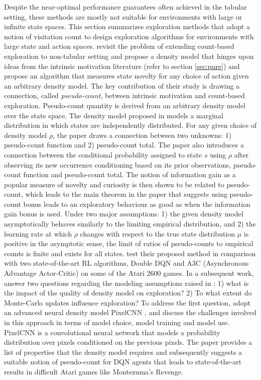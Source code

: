 Despite the near-optimal performance guarantees often achieved in the tabular setting, these methods are mostly not suitable for environments with large or infinite state spaces. This section summarizes exploration methods that adopt a notion of visitation count to design exploration algorithms for environments with large state and action spaces. 
 revisit the problem of extending count-based exploration to non-tabular setting and propose a density model that hinges upon ideas from the intrinsic motivation literature (refer to section \ref{sec:pure}) and propose an algorithm that measures state novelty for any choice of action given an arbitrary density model. The key contribution of their study is drawing a connection, called \textit{pseudo-count}, between intrinsic motivation and count-based exploration. Pseudo-count quantity is derived from an arbitrary density model over the state space. The density model proposed in  models a marginal distribution in which states are independently distributed. For any given choice of density model $ \rho $, the paper draws a connection between two unknowns: 1) pseudo-count function and 2) pseudo-count total.  The paper also introduces a connection between the conditional probability assigned to state $s$ using $ \rho $ after observing its new occurrence conditioning based on its prior observations, pseudo-count function and pseudo-count total.  The notion of information gain as a popular measure of novelty and curiosity is then shown to be related to pseudo-count, which leads to the main theorem in the paper that suggests using pseudo-count bonus leads to an exploratory behaviour as good as when the information gain bonus is used. Under two major assumptions: 1) the given density model asymptotically behaves similarly to the limiting empirical distribution, and 2) the learning rate at which $\rho$ changes with respect to the true state distribution $\mu$ is positive in the asymptotic sense, the limit of ratios of pseudo-counts to empirical counts is finite and exists for all states.  test their proposed method in comparison with two state-of-the-art RL algorithms, Double DQN  and A3C (Asynchronous Advantage Actor-Critic)  on some of the Atari 2600 games. 
In a subsequent work,  answer two questions regarding the modeling assumptions raised in : 1) what is the impact of the quality of density model on exploration? 2) To what extent do Monte-Carlo updates influence exploration? To address the first question,  adopt an advanced neural density model PixelCNN , and discuss the challenges involved in this approach in terms of model choice, model training and model use. PixelCNN is a convolutional neural network that models a probability distribution over pixels conditioned on the previous pixels. The paper provides a list of properties that the density model requires and subsequently suggests a suitable notion of pseudo-count for DQN agents that leads to state-of-the-art results in difficult Atari games like Montezuma's Revenge.
